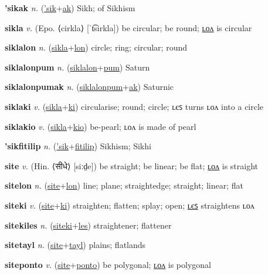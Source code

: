 \textbf{\hypertarget{'sikak}{'sikak}} \textit{n.} (\hyperlink{'sik}{'sik}+\allowbreak \hyperlink{ak}{ak})
Sikh; of Sikhism

\textbf{\hypertarget{sikla}{sikla}} \textit{v.} (Epo. ⟨cirkla⟩ [ˈt͡sirkla])
be circular; be round; \hyperlink{siklalon}{ʟᴏᴧ} is circular

\textbf{\hypertarget{siklalon}{siklalon}} \textit{n.} (\hyperlink{sikla}{sikla}+\allowbreak \hyperlink{lon}{lon})
circle; ring; circular; round

\textbf{\hypertarget{siklalonpum}{siklalonpum}} \textit{n.} (\hyperlink{siklalon}{siklalon}+\allowbreak \hyperlink{pum}{pum})
Saturn

\textbf{\hypertarget{siklalonpumak}{siklalonpumak}} \textit{n.} (\hyperlink{siklalonpum}{siklalonpum}+\allowbreak \hyperlink{ak}{ak})
Saturnic

\textbf{\hypertarget{siklaki}{siklaki}} \textit{v.} (\hyperlink{sikla}{sikla}+\allowbreak \hyperlink{ki}{ki})
circularise; round; circle; ʟєꜱ turns ʟᴏᴧ into a circle

\textbf{\hypertarget{siklakio}{siklakio}} \textit{v.} (\hyperlink{sikla}{sikla}+\allowbreak \hyperlink{kio}{kio})
be-pearl; ʟᴏᴧ is made of pearl

\textbf{\hypertarget{'sikfitilip}{'sikfitilip}} \textit{n.} (\hyperlink{'sik}{'sik}+\allowbreak \hyperlink{fitilip}{fitilip})
Sikhism; Sikhi

\textbf{\hypertarget{site}{site}} \textit{v.} (Hin. ⟨{\devanagari{}सीधे}⟩ [siːd̤e])
be straight; be linear; be flat; \hyperlink{sitelon}{ʟᴏᴧ} is straight

\textbf{\hypertarget{sitelon}{sitelon}} \textit{n.} (\hyperlink{site}{site}+\allowbreak \hyperlink{lon}{lon})
line; plane; straightedge; straight; linear; flat

\textbf{\hypertarget{siteki}{siteki}} \textit{v.} (\hyperlink{site}{site}+\allowbreak \hyperlink{ki}{ki})
straighten; flatten; splay; open; \hyperlink{sitekiles}{ʟєꜱ} straightens ʟᴏᴧ

\textbf{\hypertarget{sitekiles}{sitekiles}} \textit{n.} (\hyperlink{siteki}{siteki}+\allowbreak \hyperlink{les}{les})
straightener; flattener

\textbf{\hypertarget{sitetayl}{sitetayl}} \textit{n.} (\hyperlink{site}{site}+\allowbreak \hyperlink{tayl}{tayl})
plains; flatlands

\textbf{\hypertarget{siteponto}{siteponto}} \textit{v.} (\hyperlink{site}{site}+\allowbreak \hyperlink{ponto}{ponto})
be polygonal; \hyperlink{sitepontolon}{ʟᴏᴧ} is polygonal

